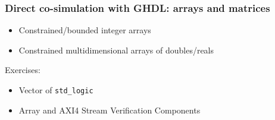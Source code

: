 \documentclass[xcolor={usenames,dvipsnames}]{beamer}
\begin{document}
\begin{frame}
\frametitle{Direct co-simulation with GHDL: arrays and matrices}

\begin{itemize}
\item Constrained/bounded integer arrays \href{https://ghdl.github.io/ghdl-cosim/vhpidirect/examples/arrays.html\#constrained-bounded-integer-arrays}{\faBook}
\item Constrained multidimensional arrays of doubles/reals \href{https://ghdl.github.io/ghdl-cosim/vhpidirect/examples/arrays.html\#constrained-multidimensional-arrays-of-doubles-reals}{\faBook}
\end{itemize}

\vfill

Exercises:
\begin{itemize}
\item Vector of \lstinline{std_logic}
\href{https://ghdl.github.io/ghdl-cosim/vhpidirect/examples/arrays.html\#vector-of-std-logic}{\faBook}
\href{https://github.com/ghdl/ghdl-cosim/blob/master/vhpidirect/arrays/logicvector}{\faCode}

\item Array and AXI4 Stream Verification Components
\href{https://ghdl.github.io/ghdl-cosim/vhpidirect/examples/arrays.html\#array-and-axi4-stream-verification-components}{\faBook}
\href{https://github.com/ghdl/ghdl-cosim/blob/master/vhpidirect/arrays/matrices/vunit_axis_vcs}{\faCode}

\end{itemize}
\end{frame}
\end{document}
